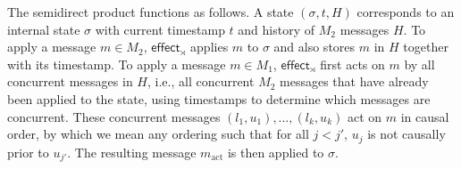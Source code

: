\documentclass[acmsmall,nonacm,12pt]{acmart}
\newcommand{\msf}[1]{\ensuremath{\mathsf{#1}}}
\theoremstyle{plain}
\theoremstyle{definition}
\begin{document}
The semidirect product functions as follows.  A state $(\sigma, t,  H)$ corresponds to an internal state $\sigma$ with current timestamp $t$ and history of $M_2$ messages $H$.  To apply a message $m \in M_2$, $\msf{effect}_\rtimes$ applies $m$ to $\sigma$ and also stores $m$ in $H$ together with its timestamp.  To apply a message $m \in M_1$, $\msf{effect}_\rtimes$ first acts on $m$ by all concurrent messages in $H$, i.e., all concurrent $M_2$ messages that have already been applied to the state, using timestamps to determine which messages are concurrent.  These concurrent messages $(l_1, u_1), \dots, (l_k, u_k)$ act on $m$ in causal order, by which we mean any ordering such that for all $j < j'$, $u_j$ is not causally prior to $u_{j'}$.  The resulting message $m_{\text{act}}$ is then applied to $\sigma$.
\end{document}
